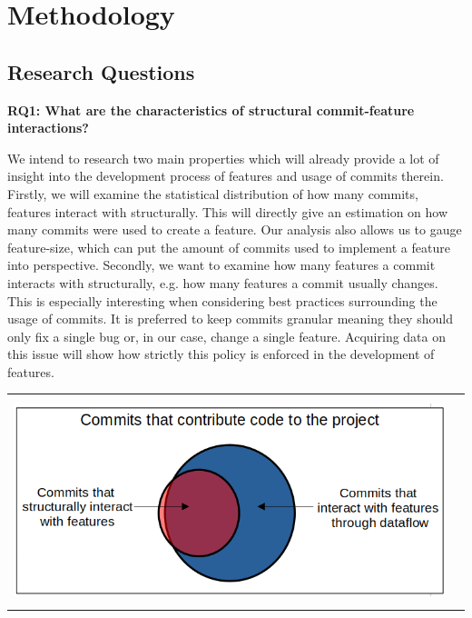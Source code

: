 \section*{Methodology}\label{ch:methodology}

\subsection*{Research Questions}\label{sec:research_questions}

\textbf{RQ1: What are the characteristics of structural commit-feature interactions?}

We intend to research two main properties which will already provide a lot of insight into the development process of features and usage of commits therein.
Firstly, we will examine the statistical distribution of how many commits, features interact with structurally.
This will directly give an estimation on how many commits were used to create a feature.
Our analysis also allows us to gauge feature-size, which can put the amount of commits used to implement a feature into perspective.
Secondly, we want to examine how many features a commit interacts with structurally, e.g. how many features a commit usually changes. 
This is especially interesting when considering best practices surrounding the usage of commits.
It is preferred to keep commits granular meaning they should only fix a single bug or, in our case, change a single feature.
Acquiring data on this issue will show how strictly this policy is enforced in the development of features. \\

\begin{center}
\begin{tabular}{cc}
\includegraphics[height=6cm]{gfx/Commits-of-a-Software-Project.png}
\end{tabular}
\end{center}


